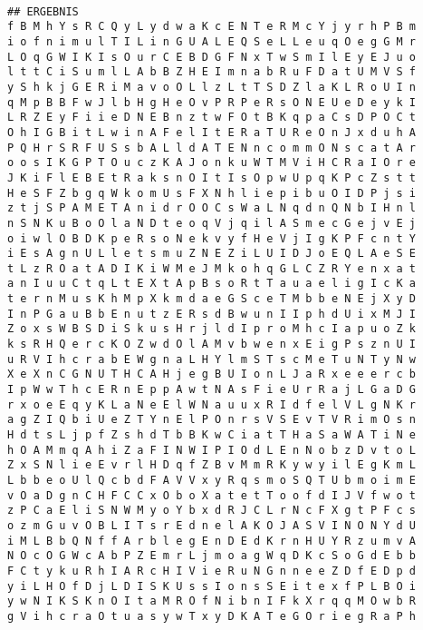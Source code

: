 \documentclass[a4paper,10pt,ngerman]{scrartcl}
\begin{document}
\begin{lstlisting}
  
## ERGEBNIS
f B M h Y s R C Q y L y d w a K c E N T e R M c Y j y r h P B m
i o f n i m u l T I L i n G U A L E Q S e L L e u q O e g G M r
L O q G W I K I s O u r C E B D G F N x T w S m I l E y E J u o
l t t C i S u m l L A b B Z H E I m n a b R u F D a t U M V S f
y S h k j G E R i M a v o O L l z L t T S D Z l a K L R o U I n
q M p B B F w J l b H g H e O v P R P e R s O N E U e D e y k I
L R Z E y F i i e D N E B n z t w F O t B K q p a C s D P O C t
O h I G B i t L w i n A F e l I t E R a T U R e O n J x d u h A
P Q H r S R F U S s b A L l d A T E N n c o m m O N s c a t A r
o o s I K G P T O u c z K A J o n k u W T M V i H C R a I O r e
J K i F l E B E t R a k s n O I t I s O p w U p q K P c Z s t t
H e S F Z b g q W k o m U s F X N h l i e p i b u O I D P j s i
z t j S P A M E T A n i d r O O C s W a L N q d n Q N b I H n l
n S N K u B o O l a N D t e o q V j q i l A S m e c G e j v E j
o i w l O B D K p e R s o N e k v y f H e V j I g K P F c n t Y
i E s A g n U L l e t s m u Z N E Z i L U I D J o E Q L A e S E
t L z R O a t A D I K i W M e J M k o h q G L C Z R Y e n x a t
a n I u u C t q L t E X t A p B s o R t T a u a e l i g I c K a
t e r n M u s K h M p X k m d a e G S c e T M b b e N E j X y D
I n P G a u B b E n u t z E R s d B w u n I I p h d U i x M J I
Z o x s W B S D i S k u s H r j l d I p r o M h c I a p u o Z k
k s R H Q e r c K O Z w d O l A M v b w e n x E i g P s z n U I
u R V I h c r a b E W g n a L H Y l m S T s c M e T u N T y N w
X e X n C G N U T H C A H j e g B U I o n L J a R x e e e r c b
I p W w T h c E R n E p p A w t N A s F i e U r R a j L G a D G
r x o e E q y K L a N e E l W N a u u x R I d f e l V L g N K r
a g Z I Q b i U e Z T Y n E l P O n r s V S E v T V R i m O s n
H d t s L j p f Z s h d T b B K w C i a t T H a S a W A T i N e
h O A M m q A h i Z a F I N W I P I O d L E n N o b z D v t o L
Z x S N l i e E v r l H D q f Z B v M m R K y w y i l E g K m L
L b b e o U l Q c b d F A V V x y R q s m o S Q T U b m o i m E
v O a D g n C H F C C x O b o X a t e t T o o f d I J V f w o t
z P C a E l i S N W M y o Y b x d R J C L r N c F X g t P F c s
o z m G u v O B L I T s r E d n e l A K O J A S V I N O N Y d U
i M L B b Q N f f A r b l e g E n D E d K r n H U Y R z u m v A
N O c O G W c A b P Z E m r L j m o a g W q D K c S o G d E b b
F C t y k u R h I A R c H I V i e R u N G n n e e Z D f E D p d
y i L H O f D j L D I S K U s s I o n s S E i t e x f P L B O i
y w N I K S K n O I t a M R O f N i b n I F k X r q q M O w b R
g V i h c r a O t u a s y w T x y D K A T e G O r i e g R a P h
\end{lstlisting}
\end{document}

